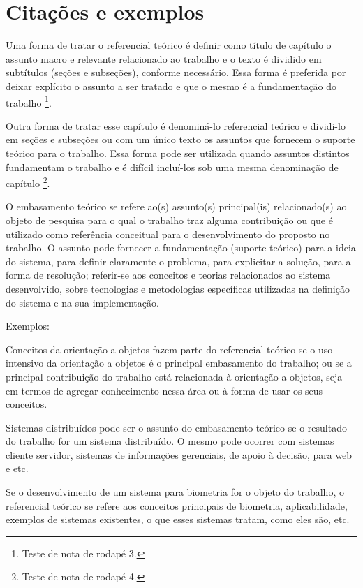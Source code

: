 \chapter{Citações e exemplos}\label{cap:citacoes}


Uma forma de tratar\cite{StorageBIT} o referencial teórico é definir como título de capítulo o assunto macro e relevante relacionado ao trabalho e o texto é dividido em subtítulos (seções e subseções), conforme necessário. Essa forma é preferida por deixar explícito o assunto a ser tratado e que o mesmo é a fundamentação do trabalho \footnote{Teste de nota de rodapé 3.}. 

Outra forma de tratar esse capítulo é denominá-lo referencial teórico e dividi-lo em seções e subseções ou com um único texto os assuntos que fornecem o suporte teórico para o trabalho. Essa forma pode ser utilizada quando assuntos distintos fundamentam o trabalho e é difícil incluí-los sob uma mesma denominação de capítulo \footnote{Teste de nota de rodapé 4.}.

O embasamento teórico se refere ao(s) assunto(s) principal(is) relacionado(s) ao objeto de pesquisa para o qual o trabalho traz alguma contribuição ou que é utilizado como referência conceitual para o desenvolvimento do proposto no trabalho. O assunto pode fornecer a fundamentação (suporte teórico) para a ideia do sistema, para definir claramente o problema, para explicitar a solução, para a forma de resolução; referir-se aos conceitos e teorias relacionados ao sistema desenvolvido, sobre tecnologias e metodologias específicas utilizadas na definição do sistema e na sua implementação.

Exemplos:

Conceitos da orientação a objetos fazem parte do referencial teórico se o uso intensivo da orientação a objetos é o principal embasamento do trabalho; ou se a principal contribuição do trabalho está relacionada à orientação a objetos, seja em termos de agregar conhecimento nessa área ou à forma de usar os seus conceitos.

Sistemas distribuídos pode ser o assunto do embasamento teórico se o resultado do trabalho for um sistema distribuído. O mesmo pode ocorrer com sistemas cliente servidor, sistemas de informações gerenciais, de apoio à decisão, para web e etc.

Se o desenvolvimento de um sistema para biometria for o objeto do trabalho, o referencial teórico se refere aos conceitos principais de biometria, aplicabilidade, exemplos de sistemas existentes, o que esses sistemas tratam, como eles são, etc.

